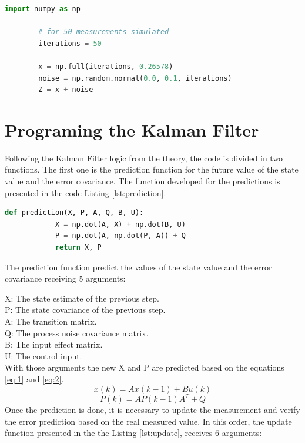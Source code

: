 \documentclass{article}
\begin{document}
    \begin{lstlisting}[language=Python, caption= Measurement data simulation, label={lst:measurementData}]
        import numpy as np

        # for 50 measurements simulated
        iterations = 50

        x = np.full(iterations, 0.26578)
        noise = np.random.normal(0.0, 0.1, iterations) 
        Z = x + noise
    \end{lstlisting}

    \section{Programing the Kalman Filter}

    Following the Kalman Filter logic from the theory, the code is divided in two functions. The first one is the  prediction function for the
    future value of the state value and the error covariance. The function developed for the predictions is presented in the code Listing \ref{lst:prediction}.

    \begin{lstlisting}[language=Python, caption= Prediction Kalman function, label={lst:prediction}]
        def prediction(X, P, A, Q, B, U):
            X = np.dot(A, X) + np.dot(B, U) 
            P = np.dot(A, np.dot(P, A)) + Q 
            return X, P    
    \end{lstlisting}


    The prediction function predict the values of the state value and the error covariance receiving 5 arguments:

    X: The state estimate of the previous step. \\
    P: The state covariance of the previous step. \\
    A: The transition matrix. \\
    Q: The process noise covariance matrix. \\
    B: The input effect matrix. \\
    U: The control input. \\

    With those arguments the new X and P are predicted based on the equations \ref{eq:1} and  \ref{eq:2}.
    \begin{equation} \label{eq:1}
        x(k) = Ax(k - 1) + Bu(k)         
    \end{equation}
    \begin{equation} \label{eq:2}
        P(k) = AP(k - 1)A^T + Q 
    \end{equation}
    Once the prediction is done, it is necessary to update the measurement and verify the error prediction based on the real measured value.
    In this order, the update function presented in the the Listing \ref{lst:update}, receives 6 arguments:
\end{document}
